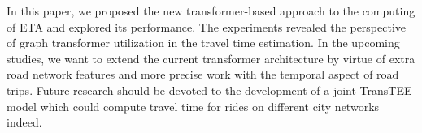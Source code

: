 \documentclass{svproc}
\begin{document}
In this paper, we proposed the new transformer-based approach to the computing of ETA and explored its performance. The experiments revealed the perspective of graph transformer utilization in the travel time estimation.
In the upcoming studies, we want to extend the current transformer architecture by virtue of extra road network features and more precise work with the temporal aspect of road trips. Future research should be devoted to the development of a joint TransTEE model which could compute travel time for rides on different city networks indeed.


 
\end{document}
